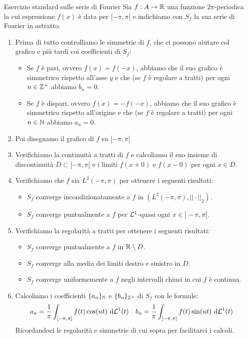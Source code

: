 \documentclass{article}
\begin{document}
\begin{example}{Esercizio standard sulle serie di Fourier}{}
    Sia $f:A\to\mathbb{R}$ una funzione $2\pi$-periodica la cui espressione $f(x)$ è data per $[-\pi,\pi[$ e indichiamo con $S_f$ la sua serie di Fourier in astratto.
    \begin{enumerate}
        \item Prima di tutto controlliamo le simmetrie di $f$, che ci possono aiutare col grafico e più tardi coi coefficienti di $S_f$:\begin{itemize}
            \item Se $f$ è pari, ovvero $f(x) = f(-x)$, abbiamo che il suo grafico è simmetrico rispetto all'asse $y$ e che (se $f$ è regolare a tratti) per ogni $n\in\mathbb{Z}^+$ abbiamo $b_n=0$.
            \item Se $f$ è dispari, ovvero $f(x)=-f(-x)$, abbiamo che il suo grafico è simmetrico rispetto all'origine e che (se $f$ è regolare a tratti) per ogni $n\in\mathbb{N}$ abbiamo $a_n=0$.
        \end{itemize}
        \item Poi disegnamo il grafico di $f$ su $[-\pi,\pi[$
        \item Verifichiamo la continuità a tratti di $f$ e calcoliamo il suo insieme di discontinuità $D\subset [-\pi,\pi[$ e i limiti $f(x+0)$ e $f(x-0)$ per ogni $x\in D$.
        \item Verifichiamo che $f$ sia $L^2(-\pi,\pi)$ per ottenere i seguenti risultati:\begin{itemize}
            \item $S_f$ converge incondizionatamente a $f$ in $(L^2(-\pi,\pi),||\cdot||_2)$.
            \item $S_f$ converge puntualmente a $f$ per $\mathcal{L}^1$-quasi ogni $x \in ]-\pi,\pi[$.
        \end{itemize}
        \item Verifichiamo la regolarità a tratti per ottenere i seguenti risultati:\begin{itemize}
            \item $S_f$ converge puntualmente a $f$ in $\mathbb{R}\setminus D$.
            \item $S_f$ converge alla media dei limiti destro e sinistro in $D$.
            \item $S_f$ converge uniformemente a $f$ negli intervalli chiusi in cui $f$ è continua.
        \end{itemize}
        \item Calcoliamo i coefficienti $\{a_n\}_{\mathbb{N}}$ e $\{b_n\}_{\mathbb{Z}^+}$ di $S_f$ con le formule:
        \[a_n = \frac{1}{\pi}\int_{[-\pi,\pi]} f(t) \cos(nt) \text{ d}\mathcal{L}^1(t) \quad b_n = \frac{1}{\pi}\int_{[-\pi,\pi]} f(t) \sin(nt) \text{ d}\mathcal{L}^1(t)\]
        Ricordandoci le regolarità e simmetrie di cui sopra per facilitarci i calcoli.
    \end{enumerate}
\end{example}
\end{document}
